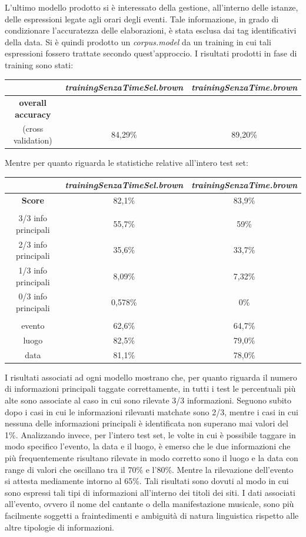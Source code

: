 \documentclass[a4paper]{report}
\begin{document}
L'ultimo modello prodotto si è interessato della gestione, all'interno delle istanze, delle espressioni legate agli orari degli eventi. Tale informazione, in grado di condizionare l'accuratezza delle elaborazioni, è stata esclusa dai tag identificativi della data. Si è quindi prodotto un \textit{corpus.model} da un training in cui tali espressioni fossero trattate secondo quest'approccio. I risultati prodotti in fase di training sono stati:
\begin{center}
\begin{tabular}{c c c}
\hline
 & \textit{trainingSenzaTimeSel.brown} & \textit{trainingSenzaTime.brown}\\
\hline
\textbf{overall accuracy} \\ (cross validation) & 84,29\% & 89,20\% \\
\hline
\end{tabular}
\end{center}
Mentre per quanto riguarda le statistiche relative all'intero test set:
\begin{center}
\begin{tabular}{|ccc|}
\hline
 & \textit{trainingSenzaTimeSel.brown} & \textit{trainingSenzaTime.brown}\\
\hline
\textbf{Score} & 82,1\% & 83,9\% \\
\hline
 & &  \\
\hline
3/3 info principali & 55,7\% & 59\% \\
2/3 info principali & 35,6\% & 33,7\% \\
1/3 info principali & 8,09\% & 7,32\% \\
0/3 info principali & 0,578\% & 0\% \\
\hline
 & &  \\
\hline
evento & 62,6\% & 64,7\% \\
luogo & 82,5\% & 79,0\% \\
data & 81,1\% & 78,0\% \\
\hline
\end{tabular}
\end{center}
I risultati associati ad ogni modello mostrano che, per quanto riguarda il numero di informazioni principali taggate correttamente, in tutti i test le percentuali più alte sono associate al caso in cui sono rilevate 3/3 informazioni. Seguono subito dopo i casi in cui le informazioni rilevanti matchate sono 2/3, mentre i casi in cui nessuna delle informazioni principali è identificata non superano mai valori del 1\%. Analizzando invece, per l'intero test set, le volte in cui è possibile taggare in modo specifico l'evento, la data e il luogo, è emerso che le due informazioni che più frequentemente risultano rilevate in modo corretto sono il luogo e la data con range di valori che oscillano tra il 70\% e l'80\%. Mentre la rilevazione dell'evento si attesta mediamente intorno al 65\%. Tali risultati sono dovuti al modo in cui sono espressi tali tipi di informazioni all'interno dei titoli dei siti. I dati associati all'evento, ovvero il nome del cantante o della manifestazione musicale, sono più facilmente soggetti a fraintedimenti e ambiguità di natura linguistica rispetto alle altre tipologie di informazioni.
\end{document}
